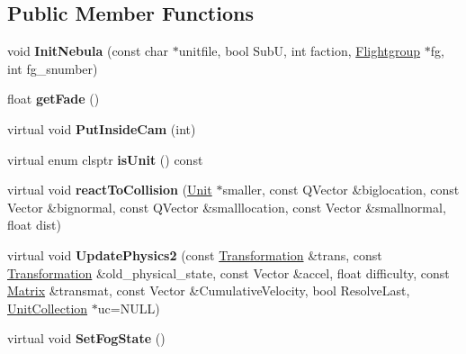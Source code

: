 \subsection*{Public Member Functions}
\begin{DoxyCompactItemize}
\item 
void {\bfseries Init\+Nebula} (const char $\ast$unitfile, bool SubU, int faction, \hyperlink{classFlightgroup}{Flightgroup} $\ast$fg, int fg\+\_\+snumber)\hypertarget{classNebula_abc9fa19a3c36af8d5b7066a19d2ee643}{}\label{classNebula_abc9fa19a3c36af8d5b7066a19d2ee643}

\item 
float {\bfseries get\+Fade} ()\hypertarget{classNebula_ad37380b1b9049d0a5789df07dd83e59a}{}\label{classNebula_ad37380b1b9049d0a5789df07dd83e59a}

\item 
virtual void {\bfseries Put\+Inside\+Cam} (int)\hypertarget{classNebula_a10a5ebffab68993132525960672d3b1d}{}\label{classNebula_a10a5ebffab68993132525960672d3b1d}

\item 
virtual enum clsptr {\bfseries is\+Unit} () const \hypertarget{classNebula_a212b80b5fa81b62df85f550459499000}{}\label{classNebula_a212b80b5fa81b62df85f550459499000}

\item 
virtual void {\bfseries react\+To\+Collision} (\hyperlink{classUnit}{Unit} $\ast$smaller, const Q\+Vector \&biglocation, const Vector \&bignormal, const Q\+Vector \&smalllocation, const Vector \&smallnormal, float dist)\hypertarget{classNebula_aaca2be40f62004818dc6dacf7c68ee95}{}\label{classNebula_aaca2be40f62004818dc6dacf7c68ee95}

\item 
virtual void {\bfseries Update\+Physics2} (const \hyperlink{structTransformation}{Transformation} \&trans, const \hyperlink{structTransformation}{Transformation} \&old\+\_\+physical\+\_\+state, const Vector \&accel, float difficulty, const \hyperlink{classMatrix}{Matrix} \&transmat, const Vector \&Cumulative\+Velocity, bool Resolve\+Last, \hyperlink{classUnitCollection}{Unit\+Collection} $\ast$uc=N\+U\+LL)\hypertarget{classNebula_aa3936dfe264d7afcdb3750939cac3352}{}\label{classNebula_aa3936dfe264d7afcdb3750939cac3352}

\item 
virtual void {\bfseries Set\+Fog\+State} ()\hypertarget{classNebula_a32c1c0b84d34f7130c9bb79ab6c36d07}{}\label{classNebula_a32c1c0b84d34f7130c9bb79ab6c36d07}

\end{DoxyCompactItemize}
